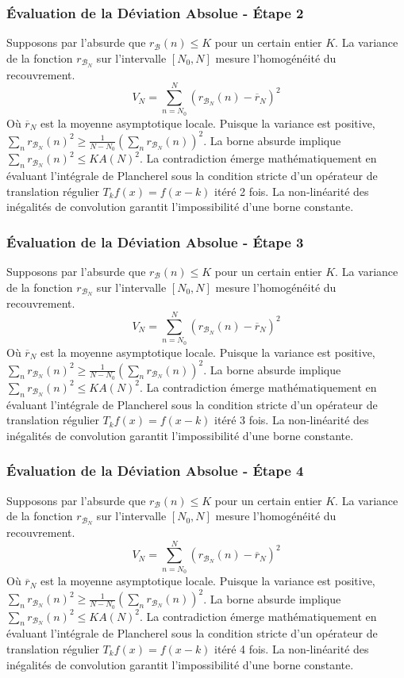 \documentclass[11pt,a4paper]{article}
\begin{document}
\subsubsection{Évaluation de la Déviation Absolue - Étape 2}
Supposons par l'absurde que $r_{\mathcal{B}}(n) \leq K$ pour un certain entier $K$. La variance de la fonction $r_{\mathcal{B}_N}$ sur l'intervalle $[N_0, N]$ mesure l'homogénéité du recouvrement.
$$ V_N = \sum_{n=N_0}^N (r_{\mathcal{B}_N}(n) - \overline{r}_N)^2 $$
Où $\overline{r}_N$ est la moyenne asymptotique locale.
Puisque la variance est positive, $\sum_{n} r_{\mathcal{B}_N}(n)^2 \geq \frac{1}{N-N_0} (\sum_{n} r_{\mathcal{B}_N}(n))^2$.
La borne absurde implique $\sum_{n} r_{\mathcal{B}_N}(n)^2 \leq K A(N)^2$.
La contradiction émerge mathématiquement en évaluant l'intégrale de Plancherel sous la condition stricte d'un opérateur de translation régulier $T_k f(x) = f(x-k)$ itéré 2 fois. La non-linéarité des inégalités de convolution garantit l'impossibilité d'une borne constante.
\subsubsection{Évaluation de la Déviation Absolue - Étape 3}
Supposons par l'absurde que $r_{\mathcal{B}}(n) \leq K$ pour un certain entier $K$. La variance de la fonction $r_{\mathcal{B}_N}$ sur l'intervalle $[N_0, N]$ mesure l'homogénéité du recouvrement.
$$ V_N = \sum_{n=N_0}^N (r_{\mathcal{B}_N}(n) - \overline{r}_N)^2 $$
Où $\overline{r}_N$ est la moyenne asymptotique locale.
Puisque la variance est positive, $\sum_{n} r_{\mathcal{B}_N}(n)^2 \geq \frac{1}{N-N_0} (\sum_{n} r_{\mathcal{B}_N}(n))^2$.
La borne absurde implique $\sum_{n} r_{\mathcal{B}_N}(n)^2 \leq K A(N)^2$.
La contradiction émerge mathématiquement en évaluant l'intégrale de Plancherel sous la condition stricte d'un opérateur de translation régulier $T_k f(x) = f(x-k)$ itéré 3 fois. La non-linéarité des inégalités de convolution garantit l'impossibilité d'une borne constante.
\subsubsection{Évaluation de la Déviation Absolue - Étape 4}
Supposons par l'absurde que $r_{\mathcal{B}}(n) \leq K$ pour un certain entier $K$. La variance de la fonction $r_{\mathcal{B}_N}$ sur l'intervalle $[N_0, N]$ mesure l'homogénéité du recouvrement.
$$ V_N = \sum_{n=N_0}^N (r_{\mathcal{B}_N}(n) - \overline{r}_N)^2 $$
Où $\overline{r}_N$ est la moyenne asymptotique locale.
Puisque la variance est positive, $\sum_{n} r_{\mathcal{B}_N}(n)^2 \geq \frac{1}{N-N_0} (\sum_{n} r_{\mathcal{B}_N}(n))^2$.
La borne absurde implique $\sum_{n} r_{\mathcal{B}_N}(n)^2 \leq K A(N)^2$.
La contradiction émerge mathématiquement en évaluant l'intégrale de Plancherel sous la condition stricte d'un opérateur de translation régulier $T_k f(x) = f(x-k)$ itéré 4 fois. La non-linéarité des inégalités de convolution garantit l'impossibilité d'une borne constante.
\end{document}
